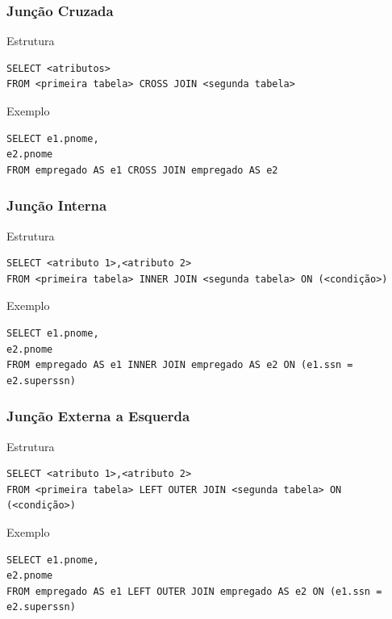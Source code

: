\documentclass{beamer}
\begin{document}
\begin{frame}[fragile]
\frametitle{Junção Cruzada}

\begin{block}{Estrutura}
	\begin{lstlisting}
SELECT <atributos>
FROM <primeira tabela> CROSS JOIN <segunda tabela>
	\end{lstlisting}
\end{block}\vfill

\begin{exampleblock}{Exemplo}
	\begin{lstlisting}
SELECT e1.pnome,
e2.pnome
FROM empregado AS e1 CROSS JOIN empregado AS e2	
\end{lstlisting}
\end{exampleblock}
\end{frame}

\begin{frame}[fragile]
\frametitle{Junção Interna}

\begin{block}{Estrutura}
	\begin{lstlisting}
SELECT <atributo 1>,<atributo 2>
FROM <primeira tabela> INNER JOIN <segunda tabela> ON (<condição>)
	\end{lstlisting}
\end{block}\vfill

\begin{exampleblock}{Exemplo}
	\begin{lstlisting}
SELECT e1.pnome,
e2.pnome
FROM empregado AS e1 INNER JOIN empregado AS e2 ON (e1.ssn = e2.superssn)
	\end{lstlisting}
\end{exampleblock}
\end{frame}

\begin{frame}[fragile]
\frametitle{Junção Externa a Esquerda}

\begin{block}{Estrutura}
	\begin{lstlisting}
SELECT <atributo 1>,<atributo 2>
FROM <primeira tabela> LEFT OUTER JOIN <segunda tabela> ON (<condição>)
	\end{lstlisting}
\end{block}\vfill

\begin{exampleblock}{Exemplo}
	\begin{lstlisting}
SELECT e1.pnome,
e2.pnome
FROM empregado AS e1 LEFT OUTER JOIN empregado AS e2 ON (e1.ssn = e2.superssn)
	\end{lstlisting}
\end{exampleblock}
\end{frame}
\end{document}
